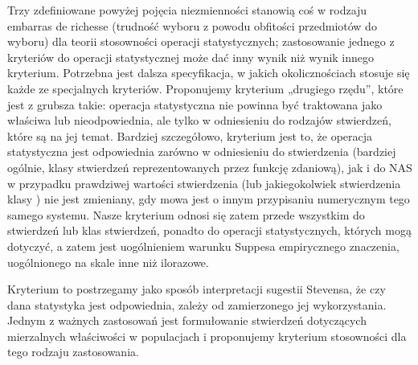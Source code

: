 \documentclass[12pt,a4paper]{report}
\begin{document}
Trzy zdefiniowane powyżej pojęcia niezmienności stanowią coś w rodzaju embarras de richesse (trudność wyboru z powodu obfitości przedmiotów do wyboru) dla teorii stosowności operacji statystycznych; zastosowanie jednego z kryteriów do operacji statystycznej może dać inny wynik niż wynik innego kryterium. Potrzebna jest dalsza specyfikacja, w jakich okolicznościach stosuje się każde ze specjalnych kryteriów. Proponujemy kryterium „drugiego rzędu”, które jest z grubsza takie: operacja statystyczna nie powinna być traktowana jako właściwa lub nieodpowiednia, ale tylko w odniesieniu do rodzajów stwierdzeń, które są na jej temat. Bardziej szczegółowo, kryterium jest to, że operacja statystyczna jest odpowiednia zarówno w odniesieniu do stwierdzenia (bardziej ogólnie, klasy stwierdzeń reprezentowanych przez funkcję zdaniową), jak i do NAS w przypadku prawdziwej wartości stwierdzenia (lub jakiegokolwiek stwierdzenia klasy ) nie jest zmieniany, gdy mowa jest o innym przypisaniu numerycznym tego samego systemu. Nasze kryterium odnosi się zatem przede wszystkim do stwierdzeń lub klas stwierdzeń, ponadto do operacji statystycznych, których mogą dotyczyć, a zatem jest uogólnieniem warunku Suppesa empirycznego znaczenia, uogólnionego na skale inne niż ilorazowe.


Kryterium to postrzegamy jako sposób interpretacji sugestii Stevensa, że czy dana statystyka jest odpowiednia, zależy od zamierzonego jej wykorzystania. Jednym z ważnych zastosowań jest formułowanie stwierdzeń dotyczących mierzalnych właściwości w populacjach i proponujemy kryterium stosowności dla tego rodzaju zastosowania.
\end{document}
